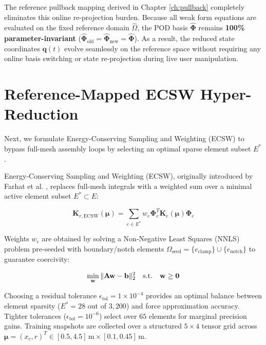 The reference pullback mapping derived in Chapter \ref{ch:pullback} completely eliminates this online re-projection burden. Because all weak form equations are evaluated on the fixed reference domain $\hat{\Omega}$, the POD basis $\hat{\boldsymbol{\Phi}}$ remains \textbf{100\% parameter-invariant} ($\hat{\boldsymbol{\Phi}}_{\text{old}} = \hat{\boldsymbol{\Phi}}_{\text{new}} = \hat{\boldsymbol{\Phi}}$). As a result, the reduced state coordinates $\mathbf{q}(t)$ evolve seamlessly on the reference space without requiring any online basis switching or state re-projection during live user manipulation.

\section{Reference-Mapped ECSW Hyper-Reduction}

Next, we formulate Energy-Conserving Sampling and Weighting (ECSW) to bypass full-mesh assembly loops by selecting an optimal sparse element subset $E^*$.

Energy-Conserving Sampling and Weighting (ECSW), originally introduced by Farhat et al. \cite{Farhat2014, farhat2015}, replaces full-mesh integrals with a weighted sum over a minimal active element subset $E^* \subset E$:

\begin{equation}
    \mathbf{K}_{r, \text{ECSW}}(\boldsymbol{\mu}) = \sum_{e \in E^*} w_e \boldsymbol{\Phi}_e^T \mathbf{K}_e(\boldsymbol{\mu}) \boldsymbol{\Phi}_e
\end{equation}

Weights $w_e$ are obtained by solving a Non-Negative Least Squares (NNLS) problem \cite{lawson1974} pre-seeded with boundary/notch elements $\Omega_{\text{seed}} = \{e_{\text{clamp}}\} \cup \{e_{\text{notch}}\}$ to guarantee coercivity:

\begin{equation}
    \min_{\mathbf{w}} \|\mathbf{A}\mathbf{w} - \mathbf{b}\|_2^2 \quad \text{s.t.} \quad \mathbf{w} \ge \mathbf{0}
\end{equation}

Choosing a residual tolerance $\epsilon_{\text{tol}} = 1 \times 10^{-4}$ provides an optimal balance between element sparsity ($E^* = 28$ out of $3,200$) and force approximation accuracy. Tighter tolerances ($\epsilon_{\text{tol}} = 10^{-6}$) select over $65$ elements for marginal precision gains. Training snapshots are collected over a structured $5 \times 4$ tensor grid across $\boldsymbol{\mu} = (x_c, r)^T \in [0.5, 4.5]\,\text{m} \times [0.1, 0.45]\,\text{m}$.


